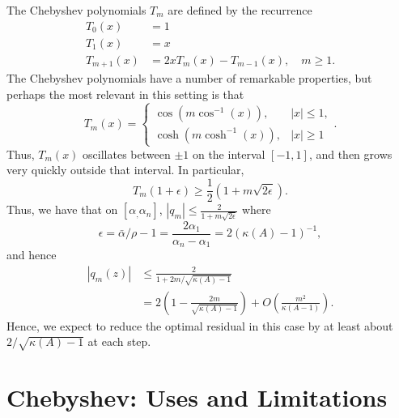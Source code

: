 \documentclass[12pt, leqno]{article} %
\begin{document}
The Chebyshev polynomials $T_m$ are defined by the recurrence
\begin{align*}
  T_0(x) &= 1 \\
  T_1(x) &= x \\
  T_{m+1}(x) &= 2x T_m(x) - T_{m-1}(x), \quad m \geq 1.
\end{align*}
The Chebyshev polynomials have a number of remarkable properties, but
perhaps the most relevant in this setting is that
\[
  T_m(x) =
  \begin{cases}
    \cos(m \cos^{-1}(x)), & |x| \leq 1, \\
    \cosh(m \cosh^{-1}(x)), &|x| \geq 1
  \end{cases}.
\]
Thus, $T_m(x)$ oscillates between $\pm 1$ on the interval $[-1,1]$,
and then grows very quickly outside that interval.  In particular,
\[
  T_{m}(1 + \epsilon) \geq \frac{1}{2} (1+m\sqrt{2\epsilon}).
\]
Thus, we have that on $[\alpha_, \alpha_n]$,
$|q_m| \leq \frac{2}{1+m\sqrt{2\epsilon}}$
where
\[
  \epsilon = \bar{\alpha}/\rho-1
  = \frac{2\alpha_1}{\alpha_n-\alpha_1}
  = 2 \left( \kappa(A)-1 \right)^{-1},
\]
and hence
\begin{align*}
  |q_m(z)|
  &\leq \frac{2}{1+2m/\sqrt{\kappa(A)-1}} \\
  &= 2\left( 1- \frac{2m}{\sqrt{\kappa(A)-1}}\right) + O\left(\frac{m^2}{\kappa(A-1)}\right).
\end{align*}
Hence, we expect to reduce the optimal residual in this case
by at least about $2/\sqrt{\kappa(A)-1}$ at each step.

\section{Chebyshev: Uses and Limitations}
\end{document}
